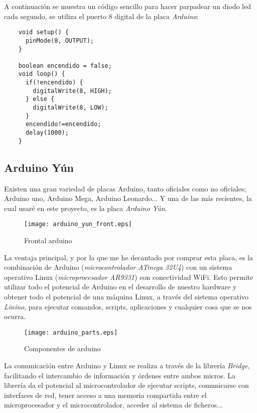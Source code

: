 A continuación se muestra un código sencillo para hacer parpadear un diodo led cada segundo, se utiliza el puerto 8 digital de la placa \emph{Arduino}:

\begin{lstlisting}
    void setup() {
      pinMode(8, OUTPUT);
    }

    boolean encendido = false;
    void loop() {
      if(!encendido) {
        digitalWrite(8, HIGH);
      } else {
        digitalWrite(8, LOW);
      }
      encendido!=encendido;
      delay(1000);
    }
\end{lstlisting}

\subsection{Arduino Yún}

Existen una gran variedad de placas Arduino, tanto oficiales como no oficiales; Arduino uno, Arduino Mega, Arduino Leonardo... Y una de las más recientes, la cual usaré en este proyecto, es la placa \emph{Arduino Yún}.

\begin{figure}[H]
    \centering
    \texttt{[image: arduino\_yun\_front.eps]}
    \caption{Frontal arduino}\label{fig:arduino-yun-front}
\end{figure}

La ventaja principal, y por la que me he decantado por comprar esta placa, es la combinación de Arduino (\emph{microcontrolador ATmega 32U4}) con un sistema operativo Linux (\emph{microprocesador AR9331}) con conectividad WiFi. Esto permite utilizar todo el potencial de Arduino en el desarrollo de nuestro hardware y obtener todo el potencial de una máquina Linux, a través del sistema operativo \emph{Linino}, para ejecutar comandos, scripts, aplicaciones y cualquier cosa que se nos ocurra.

\begin{figure}[H]
    \centering
    \texttt{[image: arduino\_parts.eps]}
    \caption{Componentes de arduino}\label{fig:arduino-parts}
\end{figure}

La comunicación entre Arduino y Linux se realiza a través de la librería \emph{Bridge}, facilitando el intercambio de información y órdenes entre ambos micros. La librería da el potencial al microcontrolador de ejecutar scripts, comunicarse con interfaces de red, tener acceso a una memoria compartida entre el microprocesador y el microcontrolador, acceder al sistema de ficheros...

